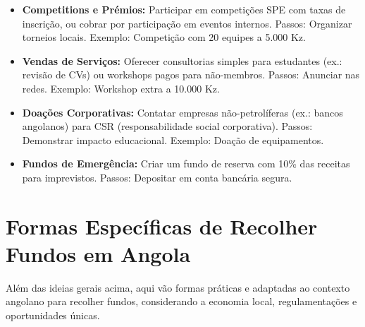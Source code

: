 \documentclass[12pt]{article}
\begin{document}
\begin{itemize}
    \item \textbf{Competitions e Prémios:} Participar em competições SPE com taxas de inscrição, ou cobrar por participação em eventos internos. Passos: Organizar torneios locais. Exemplo: Competição com 20 equipes a 5.000 Kz.
    \item \textbf{Vendas de Serviços:} Oferecer consultorias simples para estudantes (ex.: revisão de CVs) ou workshops pagos para não-membros. Passos: Anunciar nas redes. Exemplo: Workshop extra a 10.000 Kz.
    \item \textbf{Doações Corporativas:} Contatar empresas não-petrolíferas (ex.: bancos angolanos) para CSR (responsabilidade social corporativa). Passos: Demonstrar impacto educacional. Exemplo: Doação de equipamentos.
    \item \textbf{Fundos de Emergência:} Criar um fundo de reserva com 10\% das receitas para imprevistos. Passos: Depositar em conta bancária segura.
\end{itemize}

\section{Formas Específicas de Recolher Fundos em Angola}

Além das ideias gerais acima, aqui vão formas práticas e adaptadas ao contexto angolano para recolher fundos, considerando a economia local, regulamentações e oportunidades únicas.
\end{document}
